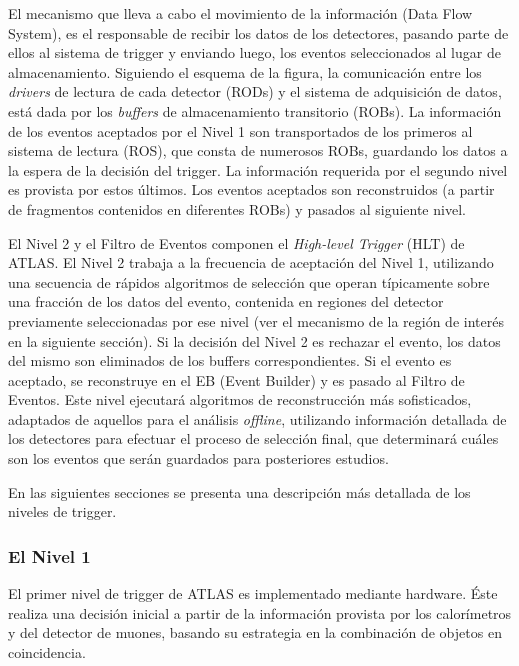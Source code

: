    El mecanismo que lleva a cabo el movimiento de la informaci\'on (Data Flow System), es el responsable de recibir los datos de los detectores, pasando parte de ellos al sistema de trigger y enviando luego, los eventos seleccionados al lugar de almacenamiento. Siguiendo el esquema de la figura, la comunicaci\'on entre los \emph{drivers} de lectura %
de cada detector (RODs) y el sistema de adquisici\'on de datos, est\'a dada por los \emph{buffers} de almacenamiento transitorio (ROBs). La informaci\'on de los eventos aceptados por el Nivel 1 son transportados de los primeros al sistema de lectura (ROS), que consta de numerosos ROBs, guardando los datos a la espera de la decisi\'on del trigger. La informaci\'on requerida por el segundo nivel es provista por estos \'ultimos. Los eventos aceptados son reconstruidos (a partir de fragmentos contenidos en diferentes ROBs) y pasados al siguiente nivel.

   El Nivel 2 y el Filtro de Eventos componen el \emph{High-level Trigger} (HLT) de ATLAS. El Nivel 2 trabaja a la frecuencia de aceptaci\'on del Nivel 1, utilizando una secuencia de r\'apidos algoritmos de selecci\'on que operan t\'ipicamente sobre una fracci\'on de los datos del evento, contenida en regiones del detector previamente seleccionadas por ese nivel (ver el mecanismo de la regi\'on de inter\'es en la siguiente secci\'on). Si la decisi\'on del Nivel 2 es rechazar el evento, los datos del mismo son eliminados de los buffers correspondientes. Si el evento es aceptado,  se reconstruye  en el EB (Event Builder) y es pasado al Filtro de Eventos. Este nivel ejecutar\'a algoritmos de reconstrucci\'on m\'as sofisticados, adaptados de aquellos para el an\'alisis \emph{offline}, utilizando informaci\'on detallada de los detectores para efectuar el proceso de selecci\'on final, que determinar\'a cu\'ales son los eventos que ser\'an guardados para posteriores estudios.

  En las siguientes secciones se presenta una descripci\'on m\'as detallada de los niveles de trigger.

 
\subsubsection{El Nivel 1}

   El primer nivel de trigger de ATLAS es implementado mediante hardware. \'Este realiza una decisi\'on inicial a partir de la informaci\'on provista por los calor\'imetros y del detector de muones, basando su estrategia en la combinaci\'on de objetos en coincidencia. %
  
